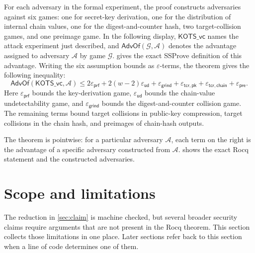 \documentclass[11pt,a4paper]{article}
\theoremstyle{plain}
\theoremstyle{definition}
\newcommand{\SSProve}{\textsf{SSProve}\xspace}
\newcommand{\AdvOf}{\mathsf{AdvOf}}
\newcommand{\A}{\mathcal{A}}
\newcommand{\epsprf}{\varepsilon_{\mathsf{prf}}}
\newcommand{\epsud}{\varepsilon_{\mathsf{ud}}}
\newcommand{\epsgr}{\varepsilon_{\mathsf{grind}}}
\newcommand{\epstpk}{\varepsilon_{\mathsf{tcr,pk}}}
\newcommand{\epstch}{\varepsilon_{\mathsf{tcr,chain}}}
\newcommand{\epspre}{\varepsilon_{\mathsf{pre}}}
\begin{document}
For each adversary in the formal experiment, the proof constructs adversaries against six games: one for secret-key derivation, one for the distribution of internal chain values, one for the digest-and-counter hash, two target-collision games, and one preimage game.
In the following display, \(\mathsf{KOTS\_vc}\) names the attack experiment just described, and \(\AdvOf(\mathcal{G},\A)\) denotes the advantage assigned to adversary \(\A\) by game \(\mathcal{G}\).
 gives the exact \SSProve definition of this advantage.
Writing the six assumption bounds as \(\varepsilon\)-terms, the theorem gives the following inequality:
\begin{equation}
\label{eq:security-bound}
  \AdvOf(\mathsf{KOTS\_vc},\A)
  \leq 2\epsprf+2(w-2)\epsud+\epsgr+\epstpk+\epstch+\epspre.
\end{equation}
Here \(\epsprf\) bounds the key-derivation game, \(\epsud\) bounds the chain-value undetectability game, and \(\epsgr\) bounds the digest-and-counter collision game.
The remaining terms bound target collisions in public-key compression, target collisions in the chain hash, and preimages of chain-hash outputs.

The theorem is pointwise: for a particular adversary \(\A\), each term on the right is the advantage of a specific adversary constructed from \(\A\).
 shows the exact Rocq statement and the constructed adversaries.

\section{Scope and limitations}
\label{sec:limits}

The reduction in \cref{sec:claim} is machine checked, but several broader security claims require arguments that are not present in the Rocq theorem.
This section collects those limitations in one place.
Later sections refer back to this section when a line of code determines one of them.
\end{document}
